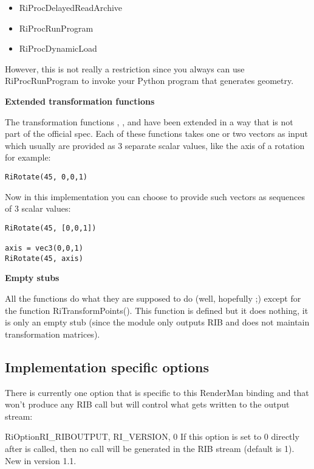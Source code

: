 \begin{itemize}
\item RiProcDelayedReadArchive 
\item RiProcRunProgram 
\item RiProcDynamicLoad
\end{itemize}

However, this is not really a restriction since you always can use
RiProcRunProgram to invoke your Python program that generates
geometry.

{\bf Extended transformation functions}

The transformation functions , , 
 and  have been extended in a way 
that is not part of the official
spec. Each of these functions takes one or two vectors as input which
usually are provided as 3 separate scalar values, like the axis of a
rotation for example:

\begin{verbatim}
RiRotate(45, 0,0,1) 
\end{verbatim}

Now in this implementation you can choose to provide such vectors as
sequences of 3 scalar values:

\begin{verbatim}
RiRotate(45, [0,0,1]) 

axis = vec3(0,0,1)
RiRotate(45, axis)
\end{verbatim}

{\bf Empty stubs}

All the functions do what they are supposed to do (well, hopefully ;)
except for the function RiTransformPoints(). This function is defined
but it does nothing, it is only an empty stub (since the module only
outputs RIB and does not maintain transformation matrices).

\subsection{Implementation specific options}

There is currently one option that is specific to this RenderMan
binding and that won't produce any RIB call but will control what gets
written to the output stream:

\begin{funcdesc}{RiOption}{RI_RIBOUTPUT, RI_VERSION, 0}
If this option is set to 0 directly after  is
called, then no  call will be generated in the RIB stream
(default is 1).\\
New in version 1.1.
\end{funcdesc}

